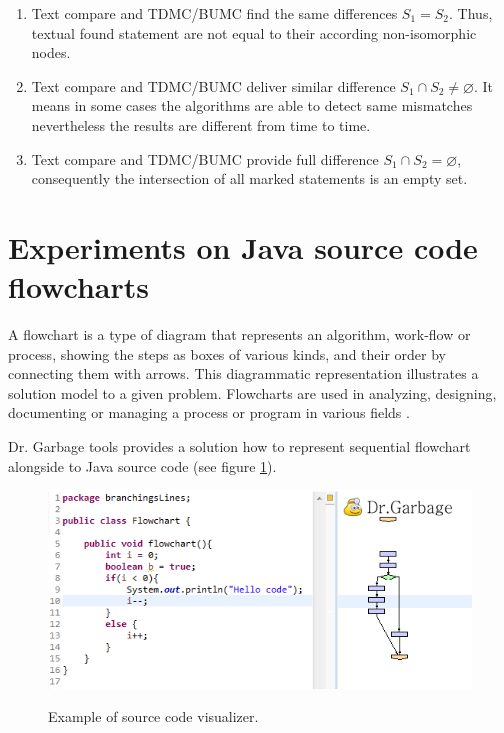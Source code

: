 \documentclass{report}
\begin{document}
\begin{enumerate}
  \item Text compare and TDMC/BUMC find the same differences $S_{1} = S_{2} $. Thus, textual found statement are not equal to their according non-isomorphic nodes.
  \item Text compare and TDMC/BUMC deliver similar difference $S_{1} \cap S_{2} \neq \varnothing $. It means in some cases the algorithms are able to detect same mismatches nevertheless the results are different from time to time.
  \item Text compare and TDMC/BUMC provide full difference $S_{1} \cap S_{2} = \varnothing $, consequently the intersection of all marked statements is an empty set.
\end{enumerate}


\section{Experiments on Java source code flowcharts}

A flowchart is a type of diagram that represents an algorithm, work-flow or process, showing the steps as boxes of various kinds, and their order by connecting them with arrows. This diagrammatic representation illustrates a solution model to a given problem. Flowcharts are used in analyzing, designing, documenting or managing a process or program in various fields \cite{wiki_flowchart}.

Dr. Garbage tools \cite{drgarbage} provides a solution how to represent sequential flowchart alongside to Java source code (see figure \ref{fig:java-flowchart-example}).
\begin{figure}[h]
  \centering
  \includegraphics[scale = 0.65]{Figures/Java-flowchart-exp/java-flowchart-example.png}\\[0.1cm]
  \caption[Java flowchart diagram opened in java source-code visualizer]{Example of source code visualizer.}
  \label{fig:java-flowchart-example}
\end{figure}
\end{document}

